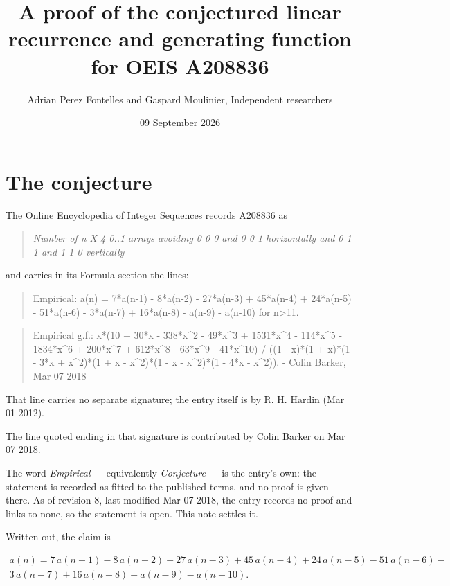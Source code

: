 \documentclass[11pt]{article}
\title{A proof of the conjectured linear recurrence and generating function for OEIS A208836}
\author{Adrian Perez Fontelles and Gaspard Moulinier, Independent researchers}
\date{09 September 2026}
\theoremstyle{definition}
\begin{document}
\maketitle
\section{The conjecture}

The Online Encyclopedia of Integer Sequences records \href{https://oeis.org/A208836}{A208836} as

\begin{quote}\itshape Number of n X 4 0..1 arrays avoiding 0 0 0 and 0 0 1 horizontally and 0 1 1 and 1 1 0 vertically\end{quote}

and carries in its Formula section the lines:

\begin{quote}\ttfamily Empirical: a(n) = 7*a(n-1) - 8*a(n-2) - 27*a(n-3) + 45*a(n-4) + 24*a(n-5) - 51*a(n-6) - 3*a(n-7) + 16*a(n-8) - a(n-9) - a(n-10) for n>11.\end{quote}

\begin{quote}\ttfamily Empirical g.f.: x*(10 + 30*x - 338*x\textasciicircum{}2 - 49*x\textasciicircum{}3 + 1531*x\textasciicircum{}4 - 114*x\textasciicircum{}5 - 1834*x\textasciicircum{}6 + 200*x\textasciicircum{}7 + 612*x\textasciicircum{}8 - 63*x\textasciicircum{}9 - 41*x\textasciicircum{}10) / ((1 - x)*(1 + x)*(1 - 3*x + x\textasciicircum{}2)*(1 + x - x\textasciicircum{}2)*(1 - x - x\textasciicircum{}2)*(1 - 4*x - x\textasciicircum{}2)). - Colin Barker, Mar 07 2018\end{quote}

That line carries no separate signature; the entry itself is by R. H. Hardin (Mar 01 2012).

The line quoted ending in that signature is contributed by Colin Barker on Mar 07 2018.

The word {\itshape Empirical} --- equivalently {\itshape Conjecture} --- is the entry's own: the statement is recorded as fitted to the published terms, and no proof is given there. As of revision 8, last modified Mar 07 2018, the entry records no proof and links to none, so the statement is open. This note settles it.

Written out, the claim is

\begin{multline*} a(n) = 7\,a(n-1) - 8\,a(n-2) - 27\,a(n-3) + 45\,a(n-4) + 24\,a(n-5) - 51\,a(n-6) - \\ 3\,a(n-7) + 16\,a(n-8) - a(n-9) - a(n-10). \end{multline*}
\end{document}
